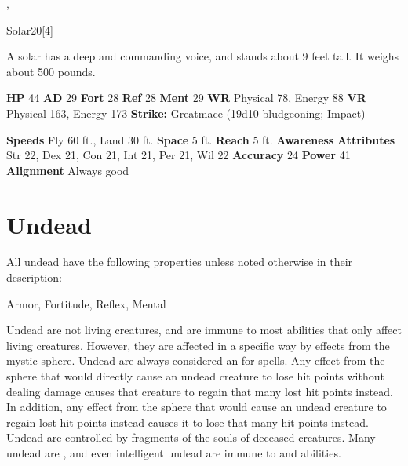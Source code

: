   ,
  \begin{monsubsection}{Solar}{20}[4]
    \vspace{-1em}\vspace{-1em}
    \vspace{0em}

    
          A solar has a deep and commanding voice, and stands about 9 feet tall. It weighs about 500 pounds.
        
    

    \begin{spellcontent}
      \begin{spelltargetinginfo}
        \pari \textbf{HP} 44 \monsep
          \textbf{AD} 29 \monsep
          \textbf{Fort} 28 \monsep
          \textbf{Ref} 28 \monsep
          \textbf{Ment} 29
        \pari \textbf{WR} Physical 78, Energy 88 \monsep
        \textbf{VR} Physical 163, Energy 173
        \pari \textbf{Strike:}
            Greatmace  (19d10 bludgeoning; Impact)
      \end{spelltargetinginfo}
    \end{spellcontent}
    \begin{monsterfooter}
      \pari \textbf{Speeds} Fly 60 ft., Land 30 ft. \monsep
        \textbf{Space} 5 ft. \monsep
        \textbf{Reach} 5 ft.
      \pari \textbf{Awareness} 
      \pari \textbf{Attributes}
        Str 22, Dex 21,
        Con 21, Int 21,
        Per 21, Wil 22
      \pari \textbf{Accuracy} 24 \monsep
        \textbf{Power} 41
      \pari \textbf{Alignment} Always good
    \end{monsterfooter}
  \end{monsubsection}
  
  
  
        \section{Undead}

        All undead have the following properties unless noted otherwise in their description:
        
    
     Armor,
     Fortitude,
     Reflex,
     Mental
  
     Undead are not living creatures, and are immune to most abilities that only affect living creatures.
    However, they are affected in a specific way by effects from the  mystic sphere.
    Undead are always considered an  for  spells.
    Any effect from the  sphere that would directly cause an undead creature to lose hit points without dealing damage causes that creature to regain that many lost hit points instead.
    In addition, any effect from the  sphere that would cause an undead creature to regain lost hit points instead causes it to lose that many hit points instead.
     Undead are controlled by fragments of the souls of deceased creatures.
    Many undead are , and even intelligent undead are immune to  and  abilities.
  
